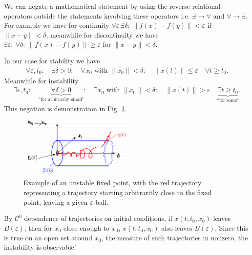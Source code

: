 \begin{remark}[]
	We can negate a mathematical statement by using the reverse relational operators outside the statements involving these operators i.e. $ \exists \to \forall $ and $\forall \to \exists $. For example we have for continuity $\forall \varepsilon\ \exists \delta:\  \|f( {x}) - f( {y}) \| < \varepsilon$ if $ \| {x}- {y} \|<\delta$, meanwhile for discontinuity we have  $\exists \varepsilon:\ \forall \delta:\  \|f( {x}) - f( {y}) \| \geq  \varepsilon$ for $ \| {x}- {y} \|< \delta$.

	In our case for stability we have
	\begin{align}
		\forall \varepsilon,t_0: \quad \exists \delta>0: \quad \forall  {x}_0  \textrm{ with }  \| {x}_0 \| < \delta: \quad  \| {x}(t) \|\leq \varepsilon \quad \forall t\geq t_0.
	\end{align}
Meanwhile for instability 
\begin{align}
	\exists \varepsilon,t_0:\quad \underbrace{\forall \delta>0}_{ \textrm{``for arbitrarily small"} }:\quad \exists  {x}_0  \textrm{ with }  \| {x}_0 \|<\delta: \quad  \| {x}(t) \|>\varepsilon \quad \underbrace{\exists t\geq t_0}_{ \textrm{``for some"} }.
\end{align}
This negation is demonstration in Fig. \ref{fig:instable_def}.
\begin{figure}[h!]
	\centering
	\includegraphics[width=0.5\textwidth]{figures/ch2/6unstable_def.png}
	\caption{Example of an unstable fixed point, with the red trajectory representing a trajectory starting arbitraritly close to the fixed point, leaving a given $\varepsilon$-ball.}
	\label{fig:instable_def}
\end{figure}
\end{remark}

\begin{remark}[]
	By $\mathcal{C}^0$ dependence of trajectories on initial conditions, if $ {x}(t;t_0, {x}_0)$ leaves $B(\varepsilon)$, then for $\tilde{ {x}}_0$ close enough to $ {x}_0$, $ {x}(t;t_0,\tilde{ {x}}_0)$ also leaves $B(\varepsilon)$. Since this is true on an open set around ${x}_0$, the measure of such trajectories in nonzero, the instability is observable!
\end{remark}

